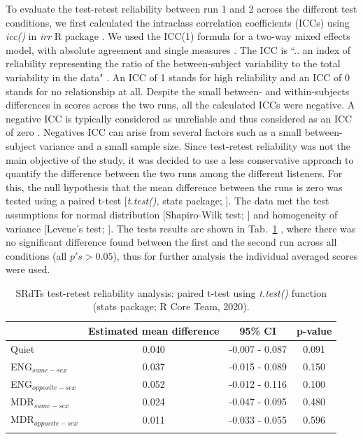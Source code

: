 \documentclass[a4paper, twoside]{templates/ociamthesis}
\begin{document}
To evaluate the test-retest reliability between run 1 and 2 across the different test conditions, we first calculated the intraclass correlation coefficients (ICCs) using \textit{icc()} in \textit{irr} R package \autocite{Stats_TestRetest_irr}. We used the ICC(1) formula for a two-way mixed effects model, with absolute agreement and single measures \autocite[cf.][]{Koo2016}. The ICC is ``.. an index of reliability representing the ratio of the between-subject variability to the total variability in the data" \autocite[p.~458]{Leensen2013}. An ICC of 1 stands for high reliability and an ICC of 0 stands for no relationship at all. Despite the small between- and within-subjects differences in scores across the two runs, all the calculated ICCs were negative. A negative ICC is typically considered as unreliable and thus considered as an ICC of zero \autocites[e.g.,][]{Qin2019,Matheson2019}. Negatives ICC can arise from several factors such as a small between-subject variance and a small sample size. Since test-retest reliability was not the main objective of the study, it was decided to use a less conservative approach to quantify the difference between the two runs among the different listeners. For this, the null hypothesis that the mean difference between the runs is zero was tested using a paired t-test {[}\textit{t.test()}, stats package; \textcite{RCoreTeam}{]}. The data met the test assumptions for normal distribution {[}Shapiro-Wilk test; \textcite{Stats_ShapiroWilkRPackage}{]} and homogeneity of variance {[}Levene's test; \textcite{Car_LevenTestRPackage}{]}. The tests results are shown in Tab.~\ref{tab:Exp2_TestRetest} , where there was no significant difference found between the first and the second run across all conditions (all \(p's > 0.05\)), thus for further analysis the individual averaged scores were used.\\

\begin{table}[ht]
\center
\caption{\label{tab:Exp2_TestRetest}{SRdTs test-retest reliability analysis: paired t-test using \textit{t.test()} function (stats package; R Core Team, 2020).}}
\renewcommand{\arraystretch}{2}
\begin{tabular}{l c c c}
\hline\hline
 &Estimated mean difference &95\% CI&p-value\\ 
\hline
Quiet & 0.040 & -0.007 -  0.087 & 0.091\\
ENG$_{same-sex}$ &  0.037 & -0.015 - 0.089 & 0.150\\
ENG$_{opposite-sex}$ & 0.052 & -0.012 - 0.116 & 0.100 \\
MDR$_{same-sex}$ & 0.024 & -0.047 - 0.095 & 0.480 \\
MDR$_{opposite-sex}$ & 0.011 & -0.033 - 0.055 & 0.596 \\
\hline\hline
\\
\end{tabular}
\label{tab:Exp2_TestRetest}
\end{table} 
\end{document}

